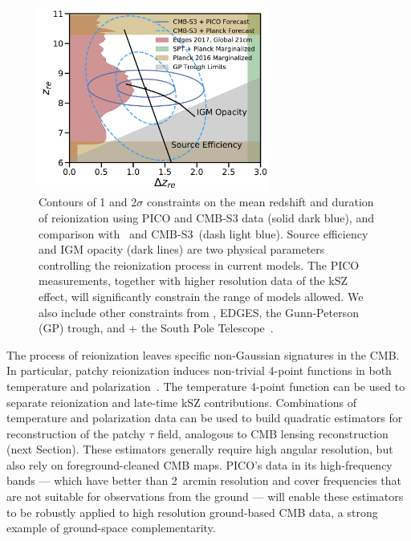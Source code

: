 \documentclass[PICOReport.tex]{subfiles}
\begin{document}
\begin{figure}
\hspace{-0.2in}
\parbox{3.1in}{\centerline {
\includegraphics[width=3.0in]{images/Reionization_Contours_zbar_delz_PICO_NEW.pdf} } }
\hspace{0.in}
\parbox{3.5in}{
\caption{\captiontext 
Contours of 1 and 2$\sigma$ constraints on the mean redshift and duration of reionization using PICO and CMB-S3 data (solid dark blue), and comparison with \planck\ and CMB-S3~(dash light blue). Source efficiency and IGM opacity (dark lines) are two physical parameters controlling the reionization process in current models. The PICO measurements, together with higher resolution data of the kSZ effect, will significantly constrain the range of models allowed. We also include other constraints from \planck , EDGES, the Gunn-Peterson (GP) trough, and \planck + the South Pole Telescope~\citep{Planck2018_VI,EDGES2017,Fan2006,Planck2016_reion}.  
\label{fig:ReionizationPICO}
} }
\vspace{-0.1in}
\end{figure}

The process of reionization leaves specific non-Gaussian signatures in the CMB.  In particular, patchy reionization induces non-trivial 4-point functions in both temperature and polarization~\citep{SmithFerraro2017,DvorkinSmith2009}.  The temperature 4-point function can be used to separate reionization and late-time kSZ contributions.  Combinations of temperature and polarization data can be used to build quadratic estimators for reconstruction of the patchy $\tau$ field, analogous to CMB lensing reconstruction (next Section).  These estimators generally require high angular resolution, but also rely on foreground-cleaned CMB maps.  PICO's data in its high-frequency bands --- which have better than 2~arcmin resolution and cover frequencies that are not suitable for observations from the ground --- will enable these estimators to be robustly applied to high resolution ground-based CMB data, a strong example of ground-space complementarity.  %
%
\end{document}
